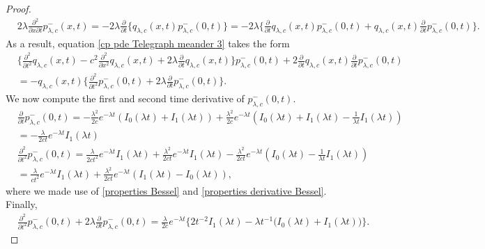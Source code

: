 \documentclass[10pt,a4paper]{amsart}
\begin{document}
\begin{proof}
\begin{align*}
&2\lambda\frac{\partial^2}{\partial x\partial t}p^{-}_{\lambda,c}(x,t) = -2\lambda \frac{\partial}{\partial t}\Big\{q_{\lambda,c}(x,t)p^{-}_{\lambda,c}(0,t)\Big\}=-2\lambda\big\{\frac{\partial}{\partial t}q_{\lambda,c}(x,t)p^{-}_{\lambda,c}(0,t)+q_{\lambda,c}(x,t)\frac{\partial}{\partial t}p^{-}_{\lambda,c}(0,t)\big\}.
\end{align*}
As a result, equation \eqref{cp pde Telegraph meander 3} takes the form 
\begin{align}\label{cp pde Telegraph meander 5}
&\Big\{\frac{\partial^2}{\partial t^2}q_{\lambda,c}(x,t)-c^2\frac{\partial^2}{\partial x^2}q_{\lambda,c}(x,t)+2\lambda\frac{\partial}{\partial t}q_{\lambda,c}(x,t)\Big\}p^{-}_{\lambda,c}(0,t)+2\frac{\partial}{\partial t}q_{\lambda,c}(x,t)\frac{\partial}{\partial t}p^{-}_{\lambda,c}(0,t)\nonumber \\
&=-q_{\lambda,c}(x,t)\big\{\frac{\partial^2}{\partial t^2}p^{-}_{\lambda,c}(0,t)+2\lambda\frac{\partial}{\partial t}p^{-}_{\lambda,c}(0,t)\big\}.
\end{align}
We now compute the first and second time derivative of $p^{-}_{\lambda,c}(0,t)$. 
\begin{align}
&\frac{\partial}{\partial t}p^{-}_{\lambda,c}(0,t) = -\frac{\lambda^2}{2c}e^{-\lambda t}(I_0(\lambda t)+I_1(\lambda t))+\frac{\lambda^2}{2c}e^{-\lambda t}(I_0(\lambda t)+I_1(\lambda t)-\frac{1}{\lambda t}I_1(\lambda t)) \nonumber\\
&=-\frac{\lambda}{2ct}e^{-\lambda t}I_1(\lambda t) \label{First Derivative p-}\\
&\frac{\partial^2}{\partial t^2}p^{-}_{\lambda,c}(0,t) = \frac{\lambda}{2ct^2}e^{-\lambda t}I_1(\lambda t)+\frac{\lambda^2}{2ct}e^{-\lambda t}I_1(\lambda t)-\frac{\lambda^2}{2ct}e^{-\lambda t}(I_0(\lambda t)-\frac{1}{\lambda t}I_1(\lambda t)) \nonumber\\&=\frac{\lambda}{ct^2}e^{-\lambda t}I_1(\lambda t)+\frac{\lambda^2}{2ct}e^{-\lambda t}(I_1(\lambda t)-I_0(\lambda t)) \label{Second Derivative p-} ,\end{align}
where we made use of \eqref{properties Bessel} and \eqref{properties derivative Bessel}. Finally,
\begin{align}\label{cp Telegraph meander 6}
&\frac{\partial^2}{\partial t^2}p^{-}_{\lambda,c}(0,t)+2\lambda\frac{\partial}{\partial t}p^{-}_{\lambda,c}(0,t) = \frac{\lambda}{2c}e^{-\lambda t}\big\{2t^{-2}I_1(\lambda t)-\lambda t^{-1}\big(I_0(\lambda t)+I_1(\lambda t)\big)\big\}.
\end{align}

\end{proof}
\end{document}
